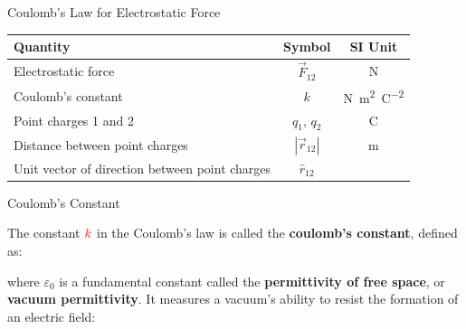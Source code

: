 \documentclass[12pt,aspectratio=169]{beamer}
\begin{document}
\begin{frame}{Coulomb's Law for Electrostatic Force}
  \begin{center}
    \begin{tabular}{l|c|c}
      \rowcolor{pink}
      \textbf{Quantity} & \textbf{Symbol} & \textbf{SI Unit} \\ \hline
      Electrostatic force    & $\vec F_{12}$ & \si\newton \\
      Coulomb's constant & $k$ &
      \si{\newton\metre\squared\per\coulomb\squared}\\
      Point charges 1 and 2  & $q_1$, $q_2$ &  \si\coulomb \\
      Distance between point charges & $|\vec r_{12}|$ & \si\metre \\
      Unit vector of direction between point charges & $\hat r_{12}$ &
    \end{tabular}
  \end{center}
\end{frame}



\begin{frame}{Coulomb's Constant}


  The constant $\color{red}{k}$ in the Coulomb's law is called the
  \textbf{coulomb's constant}, defined as:


  where $\varepsilon_0$ is a fundamental constant called the
  \textbf{permittivity of free space}, or \textbf{vacuum permittivity}. It
  measures a vacuum's ability to resist the formation of an electric field:

\end{frame}
\end{document}
